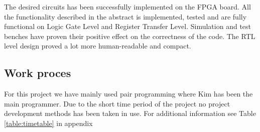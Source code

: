 The desired circuits has been successfully implemented on the FPGA board. All the functionality described in the abstract is implemented, tested and are fully functional on Logic Gate Level and Register Transfer Level. Simulation and test benches have proven their positive effect on the correctness of the code. The RTL level design proved a lot more human-readable and compact.

\subsection{Work proces} 
For this project we have mainly used pair programming where Kim has been the main programmer.
Due to the short time period of the project no project development methods has been taken in use.
For additional information see Table \ref{table:timetable} in appendix 